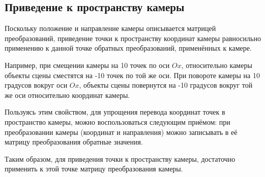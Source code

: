 \subsection{Приведение к пространству камеры}

Поскольку положение и направление камеры описывается матрицей преобразований, приведение точки к пространству координат камеры равносильно применению к данной точке обратных преобразований, применённых к камере.

Например, при смещении камеры на 10 точек по оси $Ox$, относительно камеры объекты сцены сместятся на -10 точек по той же оси. При повороте камеры на 10 градусов вокруг оси $Ox$, объекты сцены повернутся на -10 градусов вокруг той же оси относительно координат камеры.

Пользуясь этим свойством, для упрощения перевода координат точек в пространство камеры, можно воспользоваться следующим приёмом: при преобразовании камеры (координат и направления) можно записывать в её матрицу преобразования обратные значения.

Таким образом, для приведения точки к пространству камеры, достаточно применить к этой точке матрицу преобразования камеры.